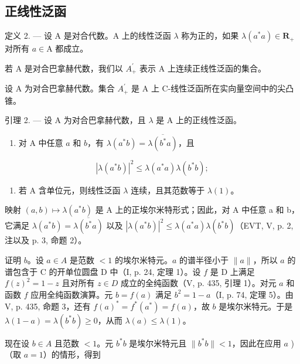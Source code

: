 \subsection{正线性泛函}

定义 2. --- 设 A 是对合代数。A 上的线性泛函 \(\lambda\) 称为正的，如果 \(\lambda(a^{*}a) \in \mathbf{R}_{+}\) 对所有 \(a \in \mathrm{A}\) 都成立。

若 A 是对合巴拿赫代数，我们以 \(A_{+}^{\prime}\) 表示 A 上连续正线性泛函的集合。

设 A 为对合巴拿赫代数。集合 \(A_{+}^{\prime}\) 是 A 上 C-线性泛函所在实向量空间中的尖凸锥。

引理 2. --- 设 A 为对合巴拿赫代数，且 \(\lambda\) 是 A 上的正线性泛函。

\begin{enumerate}
\def\labelenumi{\alph{enumi})}
\tightlist
\item
  对 A 中任意 \(a\) 和 \(b\)，有 \(\lambda(a^{*}b)=\overline{\lambda(b^{*}a)}\)，且
\end{enumerate}

\[
\left| \lambda \left(a ^ {*} b\right) \right| ^ {2} \leqslant \lambda \left(a ^ {*} a\right) \lambda \left(b ^ {*} b\right);
\]

\begin{enumerate}
\def\labelenumi{\alph{enumi})}
\setcounter{enumi}{1}
\tightlist
\item
  若 A 含单位元，则线性泛函 \(\lambda\) 连续，且其范数等于 \(\lambda(1)\)。
\end{enumerate}

映射 \((a,b)\mapsto\lambda(a^{*}b)\) 是 A 上的正埃尔米特形式；因此，对 A 中任意 a 和 b，它满足 \(\lambda(a^{*}b)=\overline{\lambda(b^{*}a)}\) 以及 \(|\lambda(a^{*}b)|^{2}\leqslant\lambda(a^{*}a)\lambda(b^{*}b)\)（EVT, V, p. 2, 注以及 p. 3, 命题 2）。

证明 \(b\)。设 \(a \in A\) 是范数 \(< 1\) 的埃尔米特元。\(a\) 的谱半径小于 \(\|a\|\)，所以 \(a\) 的谱包含于 C 的开单位圆盘 D 中（I, p. 24, 定理 1）。设 \(f\) 是 D 上满足 \(f(z)^{2} = 1 - z\) 且对所有 \(z \in D\) 成立的全纯函数（V, p. 435, 引理 1）。对元 \(a\) 和函数 \(f\) 应用全纯函数演算。元 \(b = f(a)\) 满足 \(b^{2} = 1 - a\)（I, p. 74, 定理 5）。由 V, p. 435, 命题 3，还有 \(f(a)^{*} = f^{*}(a^{*}) = f(a)\)，故 \(b\) 是埃尔米特元。于是 \(\lambda(1 - a) = \lambda(b^{*}b) \geqslant 0\)，从而 \(\lambda(a) \leqslant \lambda(1)\)。

现在设 \(b \in A\) 且范数 \(< 1\)。元 \(b^*b\) 是埃尔米特元且 \(\|b^*b\| < 1\)，因此在应用 \(a\) )（取 \(a = 1\)）的情形，得到

